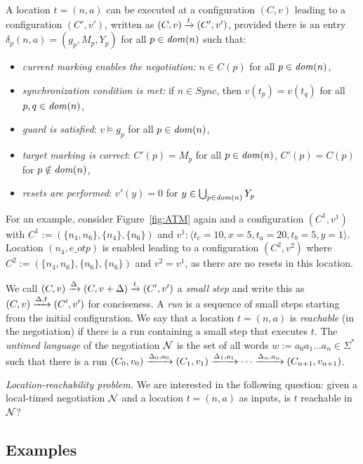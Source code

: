 A location $t = (n, a)$ can be executed at a configuration $(C, v)$ leading to a configuration $(C', v')$, written as $(C, v) \xrightarrow{t} (C', v')$, provided there is an entry $\delta_p(n, a) = (g_p, M_p, Y_p)$ for all $p \in \mathit{dom}(n)$ such that:
\begin{itemize}
	\item \emph{current marking enables the negotiation:} $n \in C(p)$ for all $p \in \mathit{dom}(n)$,
	\item \emph{synchronization condition is met:} if $n \in Sync$, then $v(t_p) = v(t_q)$ for all $p, q \in \mathit{dom}(n)$,
	\item \emph{guard is satisfied}: $v \models g_p$ for all $p \in \mathit{dom}(n)$,
	\item \emph{target marking is correct}: $C'(p) = M_p$ for all $p \in \mathit{dom}(n)$, $C'(p) = C(p)$ for $p \notin \mathit{dom}(n)$,
	\item \emph{resets are performed}: $v'(y) = 0$ for $y \in \bigcup_{p \in \mathit{dom}(n)} Y_p$
\end{itemize}

For an example, consider Figure~\ref{fig:ATM} again and a configuration $(C^1, v^1)$ with $C^1:= (\{n_4, n_6\}, \{n_4\}, \{n_6\})$ and $v^1: \langle t_c = 10, x = 5, t_a = 20, t_b = 5, y = 1 \rangle$. Location $(n_4, e\_otp)$ is enabled leading to a configuration $(C^2, v^2)$ where $C^2 := ( \{n_4, n_6\}, \{n_6\}, \{n_6\})$ and $v^2 = v^1$, as there are no resets in this location.  

We call $(C, v) \xrightarrow{\Delta} (C, v + \Delta) \xrightarrow{t} (C', v')$ a \emph{small step} and write this as $(C, v) \xrightarrow{\Delta, t} (C', v')$ for conciseness. A \emph{run} is a sequence of small steps starting from the initial configuration. We say that a location $t = (n,a)$ is \emph{reachable} (in the negotiation) if there is a run containing a small step that executes $t$. The \emph{untimed language} of the negotiation $\mathcal{N}$ is the set of all words $w:= a_0a_1\dots a_n \in \Sigma^*$ such that there is a run $(C_0, v_0)\xrightarrow{\Delta_0, a_0} (C_1, v_1) \xrightarrow{\Delta_1, a_1} \cdots\xrightarrow{\Delta_n, a_n} (C_{n+1}, v_{n+1})$. 

\emph{Location-reachability problem.} We are interested in the following question: given a local-timed negotiation $\mathcal{N}$ and a location $t =(n,a)$ as inputs, is $t$ reachable in $\mathcal{N}$?

\subsection{Examples}

